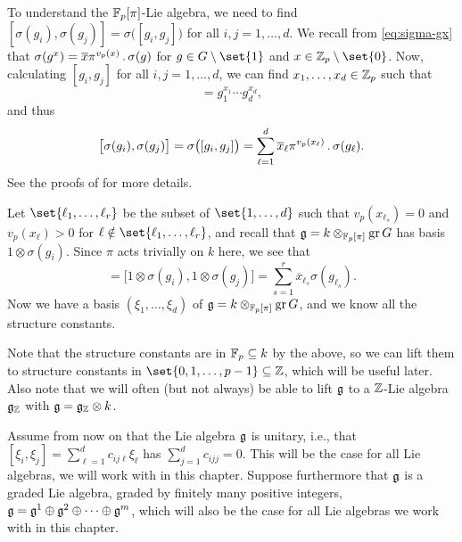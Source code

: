 To understand the $\mathbb{F}_{p}[\pi]$-Lie algebra, we need to find $[\sigma(g_{i}),\sigma(g_{j})] = \sigma\bigl( [g_{i},g_{j}] \bigr)$ for all $i,j = 1,\dotsc,d$. We recall from \eqref{eq:sigma-gx} that $\sigma(g^{x}) = \overline{x}\pi^{v_{p}(x)} \,.\, \sigma(g)$ for $g \in G \setminus\set{1}$ and $x \in \Z_{p}\setminus\set{0}$. Now, calculating $[g_{i},g_{j}]$ for all $i,j = 1,\dotsc,d$, we can find $x_{1},\dotsc,x_{d} \in \mathbb{Z}_{p}$ such that
\begin{equation*}
  [g_{i},g_{j}] = g_{1}^{x_{1}} \dotsb g_{d}^{x_{d}},
\end{equation*}
and thus
\begin{equation*}
  \bigl[ \sigma(g_{i}),\sigma(g_{j}) \bigr] = \sigma\bigl( [g_{i},g_{j}] \bigr) = \sum_{\ell=1}^{d} \overline{x}_{\ell}\pi^{v_{p}(x_{\ell})} \,.\, \sigma(g_{\ell}).
\end{equation*}
See the proofs of \cite[Lem.~26.4 and Prop.~26.5]{Sch} for more details.

Let $\set{\ell_{1},\dotsc,\ell_{r}}$ be the subset of $\set{1,\dotsc,d}$ such that $v_{p}(x_{\ell_{s}}) = 0$ and $v_{p}(x_{\ell}) > 0$ for $\ell \notin \set{\ell_{1},\dotsc,\ell_{r}}$, and recall that $\mathfrak{g} = k \otimes_{\mathbb{F}_{p}[\pi]} \operatorname{gr} G$ has basis $1 \otimes \sigma(g_{i})$. Since $\pi$ acts trivially on $k$ here, we see that
\begin{equation*}
  [\xi_{i},\xi_{j}] = \bigl[ 1\otimes\sigma(g_{i}),1\otimes\sigma(g_{j}) \bigr] = \sum_{s=1}^{r} \overline{x}_{\ell_{s}} \sigma(g_{\ell_{s}}).
\end{equation*}
Now we have a basis $(\xi_{1},\dotsc,\xi_{d})$ of $\mathfrak{g} = k \otimes_{\mathbb{F}_{p}[\pi]} \operatorname{gr} G$, and we know all the structure constants.

\begin{remark}\label{rem:struc-consts-lift}
  Note that the structure constants are in $\mathbb{F}_{p} \subseteq k$ by the above, so we can lift them to structure constants in $\set{0,1,\dotsc,p-1} \subseteq \Z$, which will be useful later. Also note that we will often (but not always) be able to lift $\mathfrak{g}$ to a $\mathbb{Z}$-Lie algebra $\mathfrak{g}_{\mathbb{Z}}$ with $\mathfrak{g} = \mathfrak{g}_{\mathbb{Z}} \otimes k$.
\end{remark}

Assume from now on that the Lie algebra $\mathfrak{g}$ is unitary, i.e., that $[\xi_{i},\xi_{j}] = \sum_{\ell=1}^{d} c_{ij\ell} \xi_{\ell}$ has $\sum_{j=1}^{d} c_{ijj} = 0$. This will be the case for all Lie algebras, we will work with in this chapter. Suppose furthermore that $\mathfrak{g}$ is a graded Lie algebra, graded by finitely many positive integers, $\mathfrak{g} = \mathfrak{g}^{1} \oplus \mathfrak{g}^{2} \oplus \dotsb \oplus \mathfrak{g}^{m}$, which will also be the case for all Lie algebras we work with in this chapter.

